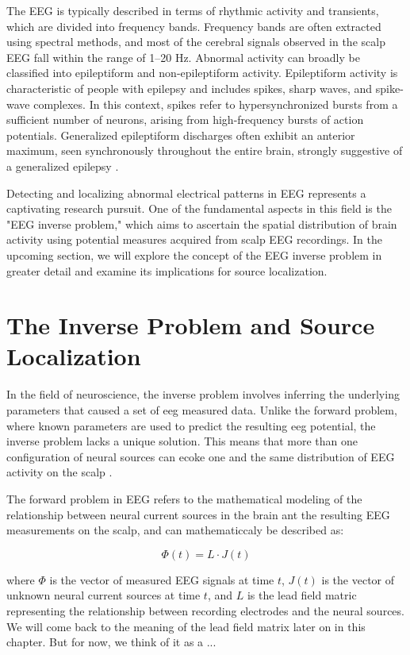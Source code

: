 \documentclass[a4paper, UKenglish, 11pt]{uiomaster}
\begin{document}
The EEG is typically described in terms of rhythmic activity and transients, which are divided into frequency bands. Frequency bands are often extracted using spectral methods, and most of the cerebral signals observed in the scalp EEG fall within the range of 1–20 Hz. Abnormal activity can broadly be classified into epileptiform and non-epileptiform activity. Epileptiform activity is characteristic of people with epilepsy and includes spikes, sharp waves, and spike-wave complexes. In this context, spikes refer to hypersynchronized bursts from a sufficient number of neurons, arising from high-frequency bursts of action potentials. Generalized epileptiform discharges often exhibit an anterior maximum, seen synchronously throughout the entire brain, strongly suggestive of a generalized epilepsy \cite{bromfield2006introduction}.

Detecting and localizing abnormal electrical patterns in EEG represents a captivating research pursuit. One of the fundamental aspects in this field is the "EEG inverse problem," which aims to ascertain the spatial distribution of brain activity using potential measures acquired from scalp EEG recordings. In the upcoming section, we will explore the concept of the EEG inverse problem in greater detail and examine its implications for source localization.

\section{The Inverse Problem and Source Localization}
In the field of neuroscience, the inverse problem involves inferring the underlying parameters that caused a set of eeg measured data. Unlike the forward problem, where known parameters are used to predict the resulting eeg potential, the inverse problem lacks a unique solution. This means that more than one configuration of neural sources can ecoke one and the same distribution of EEG activity on the scalp \cite{hecker2021convdip}.

The forward problem in EEG refers to the mathematical modeling of the relationship between neural current sources in the brain ant the resulting EEG measurements on the scalp, and can mathematiccaly be described as:

\begin{equation}
\Phi(t) = L \cdot J(t)
\label{eq:forward_problem}
\end{equation}

where $\Phi$ is the vector of measured EEG signals at time $t$, $J(t)$ is the vector of unknown neural current sources at time $t$, and $L$ is the lead field matric representing the relationship between recording electrodes and the neural sources. We will come back to the meaning of the lead field matrix later on in this chapter. But for now, we think of it as a ...
\end{document}
